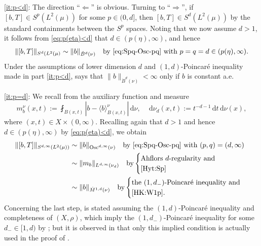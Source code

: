 \documentclass[reqno]{amsart}
\newcommand{\ud}[0]{\,\mathrm{d}}
\newcommand{\abs}[1]{|#1|}
\newcommand{\Norm}[2]{\|#1\|_{#2}}
\newcommand{\ave}[1]{\langle #1\rangle}
\theoremstyle{plain}
\theoremstyle{definition}
\theoremstyle{remark}
\begin{document}
\eqref{it:p<d}: The direction ``$\Leftarrow$'' is obvious. Turning to ``$\Rightarrow$'', if $[b,T]\in S^p(L^2(\mu))$ for some $p\in(0,d]$, then $[b,T]\in S^d(L^2(\mu))$ by the standard containments between the $S^p$ spaces. Noting that we now assume $d>1$, it follows from \eqref{eq:p(eta)<d} that $d\in(p(\eta),\infty)$, and hence
\begin{equation*}
  \Norm{[b,T]}{S^d(L^2(\mu)}
  \sim \Norm{b}{\dot B^d(\nu)}
    \quad\text{by \eqref{eq:Spq-Osc-pq} with }p=q=d\in(p(\eta),\infty).
\end{equation*}
Under the assumptions of lower dimension $d$ and $(1,d)$-Poincar\'e inequality made in part \eqref{it:p<d}, \cite[Theorem 1.5(2)]{HK:W1p} says that $\Norm{b}{\dot B^d(\nu)}<\infty$ only if $b$ is constant a.e.

\eqref{it:p=d}: We recall from \cite{HK:W1p} the auxiliary function and measure
\begin{equation*}
  m_b^\nu(x,t):=\fint_{B(x,t)}\abs{b-\ave{b}_{B(x,t)}^\nu}\ud\nu,\quad
  \ud\nu_d(x,t):=t^{-d-1}\ud t\ud\nu(x),
\end{equation*}
where $(x,t)\in X\times(0,\infty)$. Recalling again that $d>1$ and hence $d\in(p(\eta),\infty)$ by \eqref{eq:p(eta)<d}, we obtain
\begin{equation*}
\begin{split}
  \Norm{[b,T]}{S^{d,\infty}(L^2(\mu))}
  &\sim \Norm{b}{\operatorname{Osc}^{d,\infty}(\nu)}
    \quad\text{by \eqref{eq:Spq-Osc-pq} with }(p,q)=(d,\infty) \\
  &\sim \Norm{m_b}{L^{d,\infty}(\nu_d)}
  \quad\text{by}\begin{cases}
      \text{Ahflors $d$-regularity and} \\ \text{\cite[Proposition 1.29(2)]{Hyt:Sp}}
    \end{cases} \\
  &\sim \Norm{b}{\dot M^{1,d}(\nu)}
  \quad\text{by}\begin{cases}
      \text{the $(1,d_-)$-Poincar\'e inequality and} \\ \text{\cite[Theorem 1.1 and Remark 2.9]{HK:W1p}}.
    \end{cases}
\end{split}
\end{equation*}
Concerning the last step, \cite[Theorem 1.1]{HK:W1p} is stated assuming the $(1,d)$-Poincar\'e inequality and completeness of $(X,\rho)$, which imply the $(1,d_-)$-Poincar\'e inequality for some $d_-\in[1,d)$ by \cite{KZ:08}; but it is observed in \cite[Remark 2.9]{HK:W1p} that only this implied condition is actually used in the proof of \cite[Theorem 1.1]{HK:W1p}.
\end{document}

